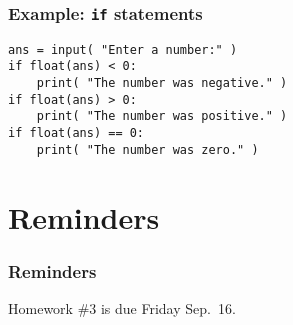 \documentclass[11pt]{beamer}
\begin{document}
\begin{frame}[fragile]
  \frametitle{Example:  \texttt{if} statements}
  \Enlarge

  \begin{Verbatim}[commandchars=\\\{\},commentchar=\%]
ans = input( "Enter a number:" )
if float(ans) < 0:
    print( "The number was negative." )
if float(ans) > 0:
    print( "The number was positive." )
if float(ans) == 0:
    print( "The number was zero." )
  \end{Verbatim}
\end{frame}

\section{Reminders}

\begin{frame}
  \frametitle{Reminders}
  \Enlarge

  \begin{itemize}
  \myitem  Homework \#3 is due Friday Sep.\ 16.
  \end{itemize}
\end{frame}
\end{document}
